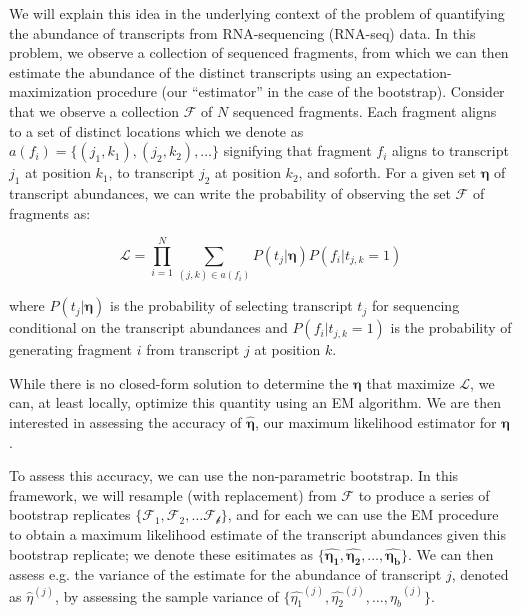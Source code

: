 We will explain this idea in the underlying context of the problem of quantifying the abundance 
of transcripts from RNA-sequencing (RNA-seq) data.  In this problem, we observe a collection of 
sequenced fragments, from which we can then estimate the abundance of the distinct transcripts 
using an expectation-maximization procedure (our ``estimator'' in the case of the bootstrap).  
Consider that we observe a collection $\mathcal{F}$ of $N$ sequenced fragments. Each fragment aligns 
to a set of distinct locations which we denote as $a(f_i) = \{(j_1, k_1), (j_2, k_2), \dots\}$ 
signifying that fragment $f_i$ aligns to transcript $j_1$ at position $k_1$, to transcript $j_2$ 
at position $k_2$, and soforth.  For a given set $\mathbf{\eta}$ of transcript abundances, we can 
write the probability of observing the set $\mathcal{F}$ of fragments as:

$$
\mathcal{L} = \prod_{i=1}^{N} \sum_{(j,k) \in a(f_i)} P(t_j|\mathbf{\eta}) P(f_i|t_{j,k}=1)
$$

where $P(t_j|\mathbf{\eta})$ is the probability of selecting transcript $t_j$ for sequencing 
conditional on the transcript abundances and $P(f_i|t_{j,k}=1)$ is the probability of generating 
fragment $i$ from transcript $j$ at position $k$.


While there is no closed-form solution to determine the $\mathbf{\eta}$ that maximize $\mathcal{L}$, 
we can, at least locally, optimize this quantity using an EM algorithm.  We are then interested in 
assessing the accuracy of $\mathbf{\hat{\eta}}$, our maximum likelihood estimator for $\mathbf{\eta}$.

To assess this accuracy, we can use the non-parametric bootstrap. In this framework, we will 
resample (with replacement) from $\mathcal{F}$ to produce a series of bootstrap replicates 
$\{\mathcal{F_1}, \mathcal{F_2}, \dots \mathcal{F_b}\}$, and for each we can use the EM procedure 
to obtain a maximum likelihood estimate of the transcript abundances given this bootstrap replicate; 
we denote these esitimates as 
$\{\mathbf{\hat{\eta_1}}, \mathbf{\hat{\eta_2}}, \dots, \mathbf{\hat{\eta_b}}\}$. 
We can then assess e.g. the variance of the estimate for the abundance of transcript $j$, denoted as 
$\hat{\eta}^{(j)}$, by assessing the sample variance of 
$\{ \hat{\eta_1}^{(j)}, \hat{\eta_2}^{(j)}, \dots, \hat{\eta_b}^{(j)} \}$.

